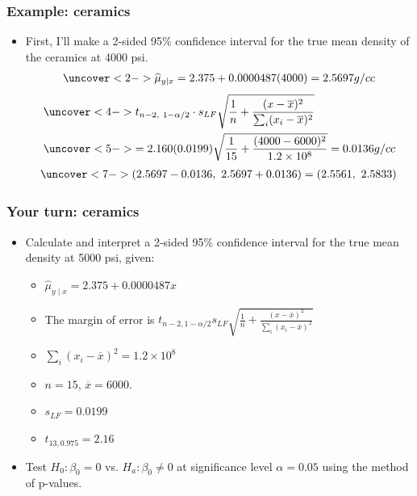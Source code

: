 \documentclass[handout]{beamer}\usepackage{graphicx, color}
\providecommand{\ov}[1]{\overline{#1}}
\providecommand{\wh}[1]{\widehat{#1}}
\numberwithin{equation}{section}
\begin{document}
\begin{frame}
\frametitle{Example: ceramics} \small
\begin{itemize}
\item First, I'll make a 2-sided 95\% confidence interval for the true mean density of the ceramics at 4000 psi.
\begin{align*}
\uncover<2->{\wh{\mu}_{y \mid x} = 2.375 + 0.0000487 (4000) = 2.5697 g/cc}
\end{align*}
\begin{align*}
&\uncover<4->{ t_{n - 2, \ 1 - \alpha/2} \cdot  s_{LF} \sqrt{    \frac{1}{n} +  \frac{(x - \ov{x})^2  }{\sum_i(x_i - \ov{x})^2}}}  \\
 &\uncover<5->{=  2.160(0.0199) \sqrt{\frac{1}{15} + \frac{(4000 - 6000)^2}{1.2 \times 10^8}} = 0.0136 g/cc}
\end{align*}
\begin{align*}
\uncover<7->{(2.5697 - 0.0136, \ 2.5697 + 0.0136) = (2.5561, \ 2.5833)}
\end{align*}
\end{itemize}
\end{frame}


\begin{frame}
\frametitle{Your turn: ceramics}

\begin{itemize}
\item Calculate and interpret a 2-sided 95\% confidence interval for the true mean density at 5000 psi, given:
\begin{itemize}
\item $\wh{\mu}_{y \mid x} = 2.375 + 0.0000487 x$
\item The margin of error is $t_{n - 2, 1 - \alpha/2} s_{LF} \sqrt{\frac{1}{n} +  \frac{(x - \ov{x})^2  }{\sum_i(x_i - \ov{x})^2}}$
\item $\sum_{i}(x_i - \ov{x})^2 = 1.2 \times 10^8$
\item $n = 15$, $\ov{x} = 6000$.
\item $s_{LF} = 0.0199$
\item $t_{13, 0.975} = 2.16$
\end{itemize}
\item Test $H_0: \beta_0 = 0$ vs. $H_a: \beta_0 \ne 0$ at significance level $\alpha = 0.05$ using the method of p-values.
\end{itemize}
\end{frame}
\end{document}
